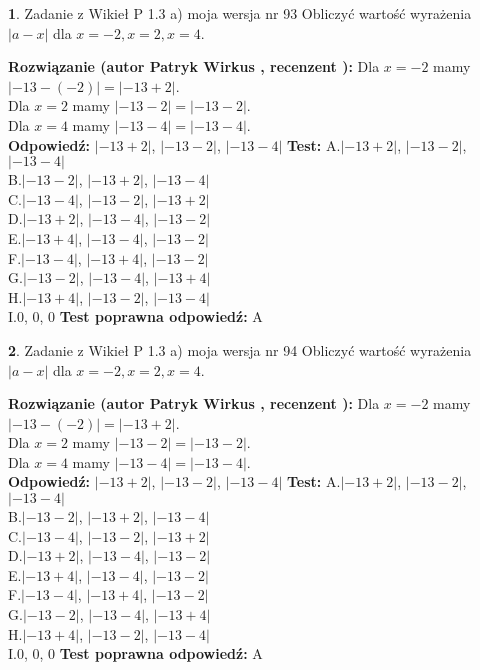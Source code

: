 \documentclass[12pt, a4paper]{article}
\theoremstyle{definition} %
\newtheorem{zad}{}
\newcommand{\zadStart}[1]{\begin{zad}#1\newline}
\newcommand{\zadStop}{\end{zad}}
\newcommand{\rozwStart}[2]{\noindent \textbf{Rozwiązanie (autor #1 , recenzent #2): }\newline}
\newcommand{\rozwStop}{\newline}
\newcommand{\odpStart}{\noindent \textbf{Odpowiedź:}\newline}
\newcommand{\odpStop}{\newline}
\newcommand{\testStart}{\noindent \textbf{Test:}\newline}
\newcommand{\testStop}{\newline}
\newcommand{\kluczStart}{\noindent \textbf{Test poprawna odpowiedź:}\newline}
\newcommand{\kluczStop}{\newline}
\begin{document}
\zadStart{Zadanie z Wikieł P 1.3 a) moja wersja nr 93}
Obliczyć wartość wyrażenia $|a - x|$ dla $x=-2,x=2,x=4$.
\zadStop
\rozwStart{Patryk Wirkus}{}
Dla $x = -2$ mamy $|-13 - (-2)| = |-13 + 2|$.\\
Dla $x = 2$ mamy $|-13 - 2| = |-13 - 2|$.\\
Dla $x = 4$ mamy $|-13 - 4| = |-13 - 4|$.\\
\rozwStop
\odpStart
$|-13 + 2|$, $|-13 - 2|$, $|-13 - 4|$
\odpStop
\testStart
A.$|-13 + 2|$, $|-13 - 2|$, $|-13 - 4|$\\
B.$|-13 - 2|$, $|-13 + 2|$, $|-13 - 4|$\\
C.$|-13 - 4|$, $|-13 - 2|$, $|-13 + 2|$\\
D.$|-13 + 2|$, $|-13 - 4|$, $|-13 - 2|$\\
E.$|-13 + 4|$, $|-13 - 4|$, $|-13 - 2|$\\
F.$|-13 - 4|$, $|-13 + 4|$, $|-13 - 2|$\\
G.$|-13 - 2|$, $|-13 - 4|$, $|-13 + 4|$\\
H.$|-13 + 4|$, $|-13 - 2|$, $|-13 - 4|$\\
I.$0$, $0$, $0$
\testStop
\kluczStart
A
\kluczStop



\zadStart{Zadanie z Wikieł P 1.3 a) moja wersja nr 94}
Obliczyć wartość wyrażenia $|a - x|$ dla $x=-2,x=2,x=4$.
\zadStop
\rozwStart{Patryk Wirkus}{}
Dla $x = -2$ mamy $|-13 - (-2)| = |-13 + 2|$.\\
Dla $x = 2$ mamy $|-13 - 2| = |-13 - 2|$.\\
Dla $x = 4$ mamy $|-13 - 4| = |-13 - 4|$.\\
\rozwStop
\odpStart
$|-13 + 2|$, $|-13 - 2|$, $|-13 - 4|$
\odpStop
\testStart
A.$|-13 + 2|$, $|-13 - 2|$, $|-13 - 4|$\\
B.$|-13 - 2|$, $|-13 + 2|$, $|-13 - 4|$\\
C.$|-13 - 4|$, $|-13 - 2|$, $|-13 + 2|$\\
D.$|-13 + 2|$, $|-13 - 4|$, $|-13 - 2|$\\
E.$|-13 + 4|$, $|-13 - 4|$, $|-13 - 2|$\\
F.$|-13 - 4|$, $|-13 + 4|$, $|-13 - 2|$\\
G.$|-13 - 2|$, $|-13 - 4|$, $|-13 + 4|$\\
H.$|-13 + 4|$, $|-13 - 2|$, $|-13 - 4|$\\
I.$0$, $0$, $0$
\testStop
\kluczStart
A
\kluczStop
\end{document}
